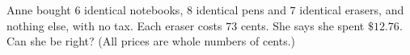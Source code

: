Anne bought $6$ identical notebooks, $8$ identical pens and $7$ identical erasers, and nothing else, with no tax. Each eraser costs $73$ cents. She says she spent $\$12.76$. Can she be right? (All prices are whole numbers of cents.)
